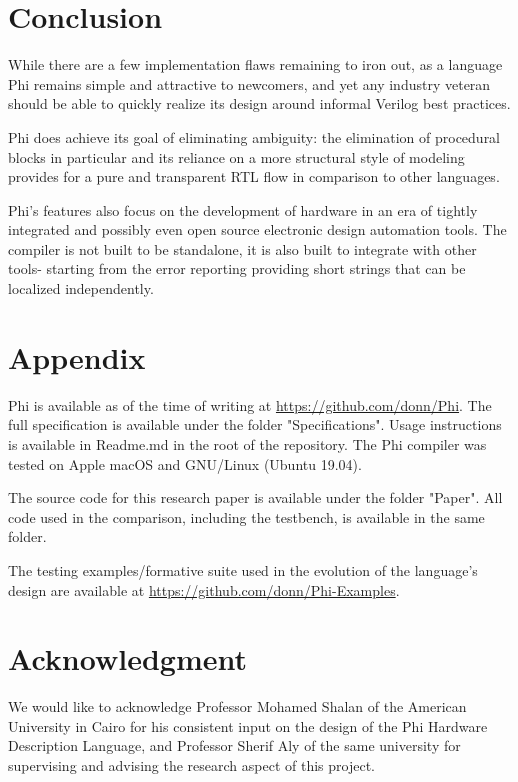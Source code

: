 \documentclass[10pt, two column]{article}
\theoremstyle{definition}
\begin{document}
\section{Conclusion}
While there are a few implementation flaws remaining to iron out, as a language Phi remains simple and attractive to newcomers, and yet any industry veteran should be able to quickly realize its design around informal Verilog best practices.\par

Phi does achieve its goal of eliminating ambiguity: the elimination of procedural blocks in particular and its reliance on a more structural style of modeling provides for a pure and transparent RTL flow in comparison to other languages.\par

Phi's features also focus on the development of hardware in an era of tightly integrated and possibly even open source electronic design automation tools. The compiler is not built to be standalone, it is also built to integrate with other tools- starting from the error reporting providing short strings that can be localized independently.\par

\section*{Appendix}
Phi is available as of the time of writing at \url{https://github.com/donn/Phi}. The full specification is available under the folder "Specifications". Usage instructions is available in Readme.md in the root of the repository. The Phi compiler was tested on  Apple macOS and GNU/Linux (Ubuntu 19.04).

The source code for this research paper is available under the folder "Paper". All code used in the comparison, including the testbench, is available in the same folder.

The testing examples/formative suite used in the evolution of the language's design are available at \url{https://github.com/donn/Phi-Examples}.

\section*{Acknowledgment}
We would like to acknowledge Professor Mohamed Shalan of the American University in Cairo for his consistent input on the design of the Phi Hardware Description Language, and Professor Sherif Aly of the same university for supervising and advising the research aspect of this project.



\end{document}
